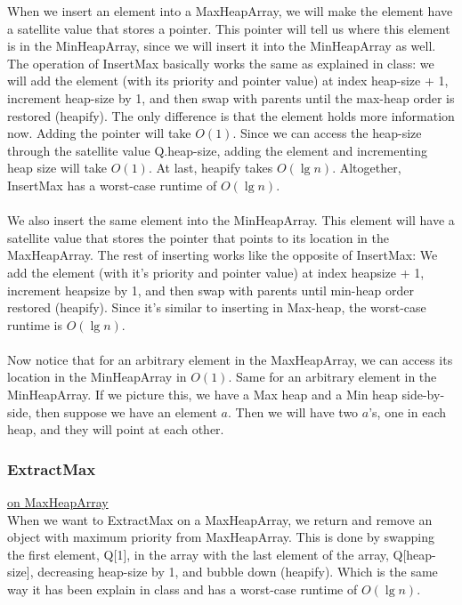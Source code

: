 \documentclass{article}
\begin{document}
When we insert an element into a MaxHeapArray, we will make the element have a satellite value that stores a pointer. This pointer will tell us where this element is in the MinHeapArray, since we will insert it into the MinHeapArray as well. The operation of InsertMax basically works the same as explained in class: we will add the element (with its priority and pointer value) at index heap-size + 1, increment heap-size by 1, and then swap with parents until the max-heap order is restored (heapify). The only difference is that the element holds more information now. Adding the pointer will take $O(1)$. Since we can access the heap-size through the satellite value Q.heap-size, adding the element and incrementing heap size will take $O(1)$. At last, heapify takes $O(\lg n)$. Altogether, InsertMax has a worst-case runtime of $O(\lg n)$. \\~\\
We also insert the same element into the MinHeapArray. This element will have a satellite value that stores the pointer that points to its location in the MaxHeapArray. The rest of inserting works like the opposite of InsertMax: We add the element (with it's priority and pointer value) at index heapsize + 1, increment heapsize by 1, and then swap with parents until min-heap order restored (heapify). Since it's similar to inserting in Max-heap, the worst-case runtime is $O(\lg n)$. \\~\\
Now notice that for an arbitrary element in the MaxHeapArray, we can access its location in the MinHeapArray in $O(1)$. Same for an arbitrary element in the MinHeapArray. If we picture this, we have a Max heap and a Min heap side-by-side, then suppose we have an element $a$. Then we will have two $a$'s, one in each heap, and they will point at each other. 


\subsubsection*{ExtractMax}
\underline{on MaxHeapArray}\\
\noindent
When we want to ExtractMax on a MaxHeapArray, we return and remove an object with maximum priority from MaxHeapArray. This is done by swapping the first element, Q[1], in the array with the last element of the array, Q[heap-size], decreasing heap-size by 1, and bubble down (heapify). Which is the same way it has been explain in class and has a worst-case runtime of $O(\lg n)$. 
\end{document}
